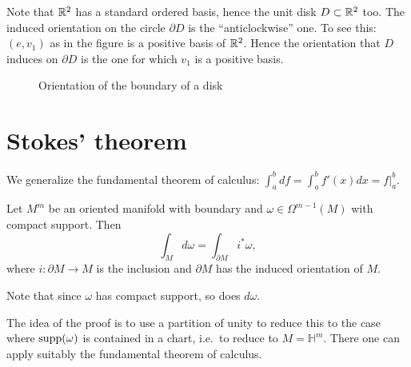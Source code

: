 \begin{eg}
    Note that $\mathbb{R}^2$ has a standard ordered basis, hence the
 unit disk $D\subset \mathbb{R}^2$ too. The induced orientation on the circle $\partial D$ is the ``anticlockwise'' one. To see this: $(e, v_1)$ as in the figure is a positive basis of $\mathbb{R}^2$. Hence the orientation that $D$ induces on $\partial D$ 
is the one for which $v_1$ is a positive basis. 
 
    \begin{figure}[H]
        \centering
        \caption{Orientation of the boundary of a disk}
        \label{fig:orientation-of-boundary}
    \end{figure}
\end{eg}

\section{Stokes' theorem}

We generalize the fundamental theorem of calculus: $\int_a^b df = \int_a^b f'(x)dx=f|_a^b$.

\begin{theorem}[Stokes]
    Let $M^m$ be an oriented manifold with boundary and $\omega \in \Omega^{m-1}(M)$ with compact support. Then
    \[
    \int_M d \omega= \int_{\partial M} i^*\omega  
    ,\] 
    where $i: \partial M\to M$ is the inclusion and $\partial M$ has the induced orientation of $M$.
\end{theorem}
\begin{remark}
    Note that since $\omega$ has compact support, so does $d\omega$.
\end{remark}
The idea of the proof is to use a partition of unity to reduce this to the case where $\operatorname{supp}(\omega)$ is contained in a chart, i.e.\ to reduce to $M=\mathbb{H}^{m}$. There one can apply suitably the fundamental theorem of calculus.


